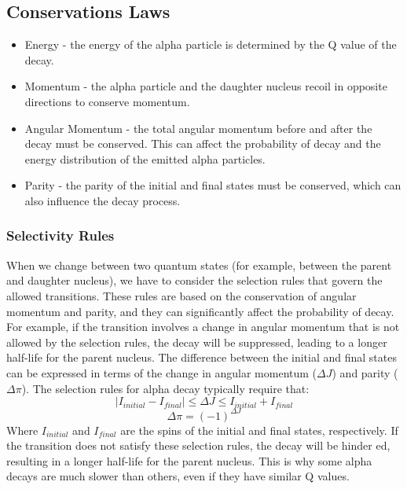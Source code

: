 \documentclass[11pt,a4paper]{article}
\begin{document}
\subsection{Conservations Laws}
\begin{itemize}
    \item Energy - the energy of the alpha particle is determined by the Q value of the decay.
    \item Momentum - the alpha particle and the daughter nucleus recoil in opposite directions to conserve momentum.
    \item Angular Momentum - the total angular momentum before and after the decay must be conserved. This can affect the probability of decay and the energy distribution of the emitted alpha particles.
    \item Parity - the parity of the initial and final states must be conserved, which can also influence the decay process.
\end{itemize}
\subsubsection{Selectivity Rules}
When we change between two quantum states (for example, between the parent and daughter nucleus), we have to consider the selection rules that govern the allowed transitions. These rules are based on the conservation of angular momentum and parity, and they can significantly affect the probability of decay. For example, if the transition involves a change in angular momentum that is not allowed by the selection rules, the decay will be suppressed, leading to a longer half-life for the parent nucleus.
The difference between the initial and final states can be expressed in terms of the change in angular momentum ($\Delta J$) and parity ($\Delta \pi$). The selection rules for alpha decay typically require that:
\begin{equation}
    |I_{initial} - I_{final}| \leq \Delta J \leq I_{initial} + I_{final}
\end{equation}
\begin{equation}
    \Delta \pi = (-1)^{\Delta J}
\end{equation}
Where $I_{initial}$ and $I_{final}$ are the spins of the initial and final states, respectively. If the transition does not satisfy these selection rules, the decay will be hinder
ed, resulting in a longer half-life for the parent nucleus. This is why some alpha decays are much slower than others, even if they have similar Q values.
\end{document}
